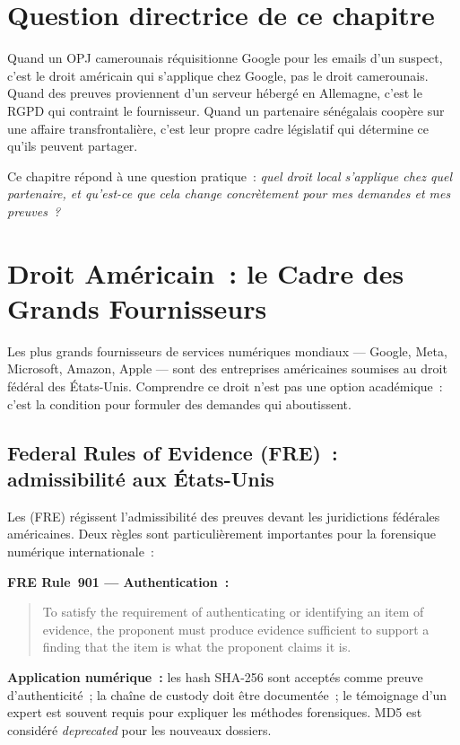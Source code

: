 \bigskip

\section*{Question directrice de ce chapitre}

Quand un OPJ camerounais réquisitionne Google pour les emails d'un suspect,
c'est le droit américain qui s'applique chez Google, pas le droit camerounais.
Quand des preuves proviennent d'un serveur hébergé en Allemagne, c'est le RGPD
qui contraint le fournisseur. Quand un partenaire sénégalais coopère sur une
affaire transfrontalière, c'est leur propre cadre législatif qui détermine ce
qu'ils peuvent partager.

Ce chapitre répond à une question pratique~: \emph{quel droit local s'applique
chez quel partenaire, et qu'est-ce que cela change concrètement pour mes
demandes et mes preuves~?}

\separateur

\section{Droit Américain~: le Cadre des Grands Fournisseurs}
\label{sec:droit-usa}

Les plus grands fournisseurs de services numériques mondiaux --- Google,
Meta, Microsoft, Amazon, Apple --- sont des entreprises américaines soumises
au droit fédéral des États-Unis. Comprendre ce droit n'est pas une option
académique~: c'est la condition pour formuler des demandes qui aboutissent.

\subsection{Federal Rules of Evidence (FRE)~: admissibilité aux États-Unis}

Les 
(FRE) régissent l'admissibilité des preuves devant les juridictions fédérales
américaines. Deux règles sont particulièrement importantes pour la forensique
numérique internationale~:

\begin{boxjuris}
\textbf{FRE Rule~901 --- Authentication~:}
\begin{quote}
To satisfy the requirement of authenticating or identifying an item of
evidence, the proponent must produce evidence sufficient to support a finding
that the item is what the proponent claims it is.
\end{quote}
\textbf{Application numérique~:} les hash SHA-256 sont acceptés comme preuve
d'authenticité~; la chaîne de custody doit être documentée~; le témoignage
d'un expert est souvent requis pour expliquer les méthodes forensiques.
MD5 est considéré \emph{deprecated} pour les nouveaux dossiers.
\end{boxjuris}

